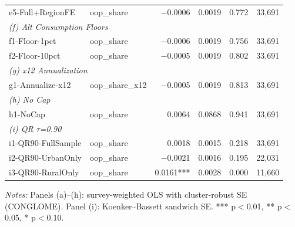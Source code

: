 \begin{table}[htbp]
\begin{tabular}{llrrrr}
  e5-Full+RegionFE & oop\_share & $-$0.0006 & 0.0019 & 0.772 & 33,691 \\
\multicolumn{6}{l}{\textit{(f) Alt Consumption Floors}} \\
  f1-Floor-1pct & oop\_share & $-$0.0006 & 0.0019 & 0.756 & 33,691 \\
  f2-Floor-10pct & oop\_share & $-$0.0005 & 0.0019 & 0.802 & 33,691 \\
\multicolumn{6}{l}{\textit{(g) x12 Annualization}} \\
  g1-Annualize-x12 & oop\_share\_x12 & $-$0.0005 & 0.0019 & 0.813 & 33,691 \\
\multicolumn{6}{l}{\textit{(h) No Cap}} \\
  h1-NoCap & oop\_share & 0.0064 & 0.0868 & 0.941 & 33,691 \\
\multicolumn{6}{l}{\textit{(i) QR $\tau$=0.90}} \\
  i1-QR90-FullSample & oop\_share & 0.0018 & 0.0015 & 0.218 & 33,691 \\
  i2-QR90-UrbanOnly & oop\_share & $-$0.0021 & 0.0016 & 0.195 & 22,031 \\
  i3-QR90-RuralOnly & oop\_share & 0.0161*** & 0.0028 & 0.000 & 11,660 \\
\bottomrule
\end{tabular}
\begin{minipage}{\textwidth}\footnotesize
\textit{Notes:} Panels (a)--(h): survey-weighted OLS with cluster-robust SE (CONGLOME).
Panel (i): Koenker--Bassett sandwich SE. *** p$<$0.01, ** p$<$0.05, * p$<$0.10.
\end{minipage}
\end{table}